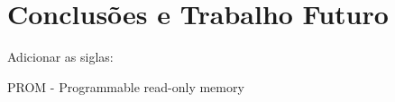 \chapter{Conclusões e Trabalho Futuro} \label{chap:concl}

Adicionar as siglas:

PROM - Programmable read-only memory